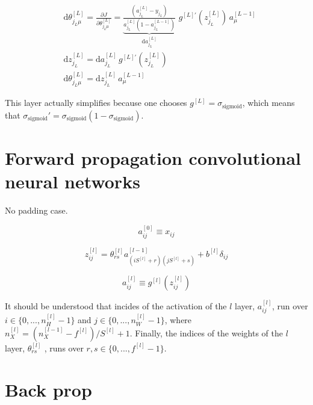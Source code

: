 \documentclass[a4paper,11pt]{article}
\newcommand{\dd}{\text{d}}
\newcommand{\na}[2]{a_{#1}^{[#2]}}
\newcommand{\nz}[2]{z_{#1}^{[#2]}}
\newcommand{\nt}[3]{\theta_{#1 #2}^{[#3]}}
\newcommand{\sg}{ \sigma_{\text{sigmoid}}}
\newcommand{\ff}[2]{#1 \left(#2 \right)}
\begin{document}
\begin{eqnarray}
    &\dd \theta^{[L]}_{j_L \mu}= \frac{\partial J }{\partial  \nt{j_L}{\mu}{L}  } =
    \underbrace{
    \frac{(\na{j_L}{L} -y_{j_L})}{\na{j_L}{L} (1-\na{j_L}{L-1} )} 
    }_{\dd a_{j_{L}}^{[L]} }
    \,\, g^{[L]'} \left( z_{j_{L}}^{[L]} \right)
   \, \na{\mu}{L-1} \\
   & \dd z^{[L]}_{j_L }= \dd a_{j_{L}}^{[L]}\,
   g^{[L]'} \left( z_{j_{L}}^{[L]} \right)\\
   &\dd \theta^{[L]}_{j_L \mu}=  \dd \nz{j_L }{L}\, \na{\mu}{L-1} 
\end{eqnarray}



This layer actually simplifies because one chooses $g^{[L]}= \sg$, 
which means that $\sg'= \sg (1- \sg) $.


\section{Forward propagation convolutional neural networks}

No padding case.

\begin{equation}
    \na{ij}{0} \equiv x_{ij} %
\end{equation}

\begin{equation}
\nz{ij  }{l} = 
    \nt{r}{s}{l} 
    \na{(i S^{[l]}+r)(j S^{[l]}+s) }{l-1} 
    +b^{[l]}\delta_{ij} 
\end{equation}

\begin{equation}
    \na{ij}{l} \equiv \ff{g^{[l]}}{  
    \nz{ij  }{l}   }  %
\end{equation}



It should be understood that incides of the activation
of the $l$ layer, $\na{ij}{l}$, run over 
$i\in\{ 0,..., n_{H}^{[l]}-1  \}$ and $j\in\{ 0,..., n_{W}^{[l]} -1 \}$, where
$n_{X}^{[l]}= (n_{X}^{[l-1]}-f^{[l]})/S^{[l]}+1$. Finally, the indices of the 
weights of the $l$ layer, $\nt{r}{s}{l}$ , runs over $r,s\in \{0,..., f^{[l]}-1\}$.




\section{Back prop}
\end{document}
